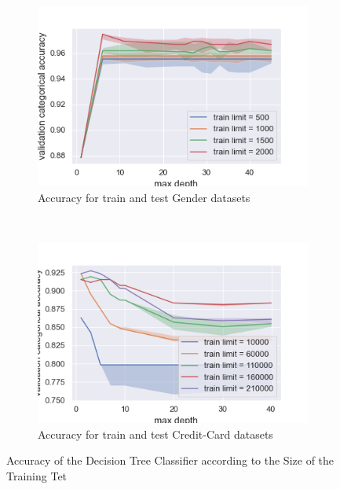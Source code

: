 \documentclass[10pt]{article}
\begin{document}
		\paragraph*{}
			\begin{figure}[h]
				\centering
				\begin{subfigure}[]{0.45\columnwidth}
					\centering
					\includegraphics[width=\linewidth]{../graphics/tree_gender_max_depth_score_type_train_limit.png}
					\caption{Accuracy for train and test Gender datasets}
					\label{tree:gender_train_size_score_type_score_type}
				\end{subfigure}
				~
				\begin{subfigure}[]{0.45\columnwidth}
					\centering
					\includegraphics[width=\linewidth]{../graphics/tree_creditcard_max_depth_score_type_train_limit.png}
					\caption{Accuracy for train and test Credit-Card datasets}
					\label{tree:creditcard_train_size_score_type_score_type}
				\end{subfigure}
				\caption{Accuracy of the Decision Tree Classifier according to the Size of the Training Tet}
				\label{tree:train_size_score_type_score_type}
			\end{figure}
\end{document}
